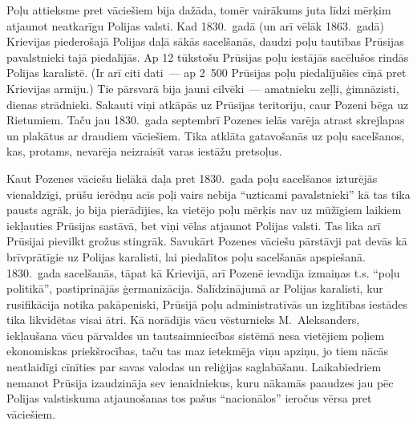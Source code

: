 \documentclass[twoside,a5paper,12pt,fleqn,openany]{extbook}
\begin{document}
Poļu attieksme pret vāciešiem bija dažāda, tomēr vairākums juta līdzi mērķim atjaunot neatkarīgu Polijas valsti. Kad 1830.~gadā (un arī vēlāk 1863.~gadā) Krievijas piederošajā Polijas daļā sākās sacelšanās, daudzi poļu tautības Prūsijas pavalstnieki tajā piedalījās. Ap 12 tūkstošu Prūsijas poļu iestājās sacēlušos rindās Polijas karalistē. (Ir arī citi dati~--- ap 2~500 Prūsijas poļu piedalījušies cīņā pret Krievijas armiju.) Tie pārsvarā bija jauni cilvēki~--- amatnieku zeļļi, ģimnāzisti, dienas strādnieki. Sakauti viņi atkāpās uz Prūsijas teritoriju, caur Pozeni bēga uz Rietumiem. Taču jau 1830.~gada septembrī Pozenes ielās varēja atrast skrejlapas un plakātus ar draudiem vāciešiem. Tika atklāta gatavošanās uz poļu sacelšanos, kas, protams, nevarēja neizraisīt varas iestāžu pretsoļus.

Kaut Pozenes vāciešu lielākā daļa pret 1830.~gada poļu sacelšanos izturējās vienaldzīgi, prūšu ierēdņu acīs poļi vairs nebija ``uzticami pavalstnieki'' kā tas tika pausts agrāk, jo bija pierādījies, ka vietējo poļu mērķis nav uz mūžīgiem laikiem iekļauties Prūsijas sastāvā, bet viņi vēlas atjaunot Polijas valsti. Tas lika arī Prūsijai pievilkt grožus stingrāk. Savukārt Pozenes vāciešu pārstāvji pat devās kā brīvprātīgie uz Polijas karalisti, lai piedalītos poļu sacelšanās apspiešanā. 1830.~gada sacelšanās, tāpat kā Krievijā, arī Pozenē ievadīja izmaiņas t.s. ``poļu politikā'', pastiprinājās ģermanizācija. Salīdzinājumā ar Polijas karalisti, kur rusifikācija notika pakāpeniski, Prūsijā poļu administratīvās un izglītības iestādes tika likvidētas visai ātri. Kā norādījis vācu vēsturnieks M.~Aleksanders, iekļaušana vācu pārvaldes un tautsaimniecības sistēmā nesa vietējiem poļiem ekonomiskas priekšrocības, taču tas maz ietekmēja viņu apziņu, jo tiem nācās neatlaidīgi cīnīties par savas valodas un reliģijas saglabāšanu. Laikabiedriem nemanot Prūsija izaudzināja sev ienaidniekus, kuru nākamās paaudzes jau pēc Polijas valstiskuma atjaunošanas tos pašus ``nacionālos'' ieročus vērsa pret vāciešiem.
\end{document}
